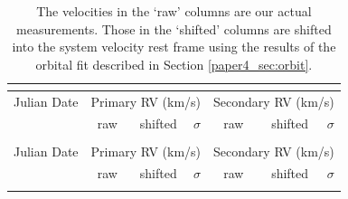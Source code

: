 \begin{small}
\begin{longtable}{lrrrrrr}
    
    \caption{The velocities in the `raw' columns are our actual measurements. Those in the `shifted' columns are shifted into the system velocity rest frame using the results of the orbital fit described in Section \ref{paper4_sec:orbit}.} \\
  \label{paper4_tab:rv_data}

    \\ \hline
    Julian Date & \multicolumn{3}{c}{Primary RV (km/s)} & \multicolumn{3}{c}{Secondary RV (km/s)} \\
& raw & shifted & $\sigma$  & raw & shifted  & $\sigma$ \\ \hline
    \endfirsthead

    \\ \hline
    Julian Date & \multicolumn{3}{c}{Primary RV (km/s)} & \multicolumn{3}{c}{Secondary RV (km/s)} \\
& raw & shifted & $\sigma$  & raw & shifted  & $\sigma$ \\ \hline
    \endhead

    \hline
    \endfoot

    \hline
    \endlastfoot



\end{longtable}
\end{small}
